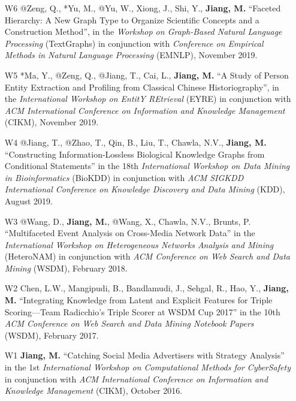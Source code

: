 \documentclass[10pt]{article}
\newenvironment{myindentpar}[1]%
{\begin{list}{}%
         {\setlength{\leftmargin}{#1}}%
         \item[]%
}
{\end{list}}
\newcounter{list}
\begin{document}
\begin{myindentpar}{0.00cm}
\begin{enumerate}[leftmargin=.5cm]
\item[W6] @Zeng, Q., *Yu, M., @Yu, W., Xiong, J., Shi, Y., \textbf{Jiang, M.} ``Faceted Hierarchy: A New Graph Type to Organize Scientific Concepts and a Construction Method'', in the \textit{Workshop on Graph-Based Natural Language Processing} (TextGraphs) in conjunction with \textit{Conference on Empirical Methods in Natural Language Processing} (EMNLP), November 2019.

\item[W5] *Ma, Y., @Zeng, Q., @Jiang, T., Cai, L., \textbf{Jiang, M.} ``A Study of Person Entity Extraction and Profiling from Classical Chinese Historiography'', in the \textit{International Workshop on EntitY REtrieval} (EYRE) in conjunction with \textit{ACM International Conference on Information and Knowledge Management} (CIKM), November 2019.

\item[W4] @Jiang, T., @Zhao, T., Qin, B., Liu, T., Chawla, N.V., \textbf{Jiang, M.} ``Constructing Information-Lossless Biological Knowledge Graphs from Conditional Statements'' in the 18th \textit{International Workshop on Data Mining in Bioinformatics} (BioKDD) in conjunction with \textit{ACM SIGKDD International Conference on Knowledge Discovery and Data Mining} (KDD), August 2019.

\item[W3] @Wang, D., \textbf{Jiang, M.}, @Wang, X., Chawla, N.V., Brunts, P. ``Multifaceted Event Analysis on Cross-Media Network Data'' in the \textit{International Workshop on Heterogeneous Networks Analysis and Mining} (HeteroNAM) in conjunction with \textit{ACM Conference on Web Search and Data Mining} (WSDM), February 2018.

\item[W2] Chen, L.W., Mangipudi, B., Bandlamudi, J., Sehgal, R., Hao, Y., \textbf{Jiang, M.} ``Integrating Knowledge from Latent and Explicit Features for Triple Scoring—Team Radicchio's Triple Scorer at WSDM Cup 2017'' in the 10th \textit{ACM Conference on Web Search and Data Mining Notebook Papers} (WSDM), February 2017.

\item[W1] \textbf{Jiang, M.} ``Catching Social Media Advertisers with Strategy Analysis'' in the 1st \textit{International Workshop on Computational Methods for CyberSafety} in conjunction with \textit{ACM International Conference on Information and Knowledge Management} (CIKM), October 2016.

\end{enumerate}


\end{myindentpar}
\end{document}
